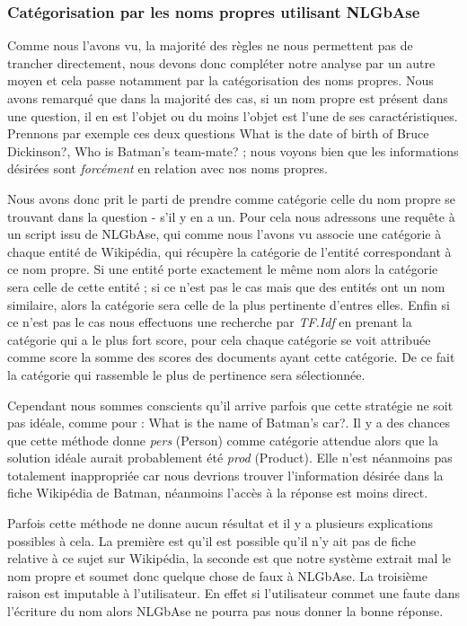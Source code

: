 \documentclass[10pt,a4paper]{article}
\begin{document}
\subsubsection{Catégorisation par les noms propres utilisant NLGbAse}
\par Comme nous l'avons vu, la majorité des règles ne nous permettent pas de trancher directement, nous devons donc compléter notre analyse par un autre moyen et cela passe notamment par la catégorisation des noms propres. Nous avons remarqué que dans la majorité des cas, si un nom propre est présent dans une question, il en est l'objet ou du moins l'objet est l'une de ses caractéristiques. Prennons par exemple ces deux questions \og{}What is the date of birth of Bruce Dickinson?\fg{}, \og{}Who is Batman's team-mate?\fg{} ; nous voyons bien que les informations désirées sont \emph{forcément} en relation avec nos noms propres.
\par Nous avons donc prit le parti de prendre comme catégorie celle du nom propre se trouvant dans la question - s'il y en a un. Pour cela nous adressons une requête à un script issu de NLGbAse, qui comme nous l'avons vu associe une catégorie à chaque entité de Wikipédia, qui récupère la catégorie de l'entité correspondant à ce nom propre. Si une entité porte exactement le même nom alors la catégorie sera celle de cette entité ; si ce n'est pas le cas mais que des entités ont un nom similaire, alors la catégorie sera celle de la plus pertinente d'entres elles. Enfin si ce n'est pas le cas nous effectuons une recherche par \emph{TF.Idf}
en prenant la catégorie qui a le plus fort score, pour cela chaque catégorie se voit attribuée comme score la somme des scores des documents ayant cette catégorie. De ce fait la catégorie qui rassemble le plus de pertinence sera sélectionnée.
\par Cependant nous sommes conscients qu'il arrive parfois que cette stratégie ne soit pas idéale, comme pour : \og{}What is the name of Batman's car?\fg{}. Il y a des chances que cette méthode donne \emph{pers} (Person) comme catégorie attendue alors que la solution idéale aurait probablement été \emph{prod} (Product). Elle n'est néanmoins pas totalement inappropriée car nous devrions trouver l'information désirée dans la fiche Wikipédia de Batman, néanmoins l'accès à la réponse est moins direct.
\par Parfois cette méthode ne donne aucun résultat et il y a plusieurs explications possibles à cela. La première est qu'il est possible qu'il n'y ait pas de fiche relative à ce sujet sur Wikipédia, la seconde est que notre système extrait mal le nom propre et soumet donc quelque chose de faux à NLGbAse. La troisième raison est imputable à l'utilisateur. En effet si l'utilisateur commet une faute dans l'écriture du nom alors NLGbAse ne pourra pas nous donner la bonne réponse. 
\end{document}
